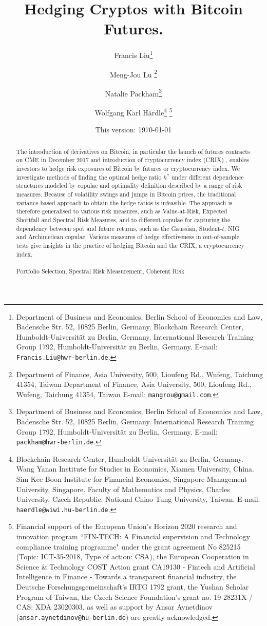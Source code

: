 \documentclass[11pt,a4paper,english]{article}
\title{\LARGE \bf Hedging Cryptos with Bitcoin Futures.}
\author{
        \and
        Francis Liu\thanks{
			Department of Business and Economics, Berlin School of Economics and Law, Badensche Str. 52, 10825 Berlin, Germany.
            Blockchain Research Center, Humboldt-Universität zu Berlin, Germany.
            International Research Training Group
1792, Humboldt-Universität zu Berlin, Germany.
     E-mail: \texttt{Francis.Liu@hwr-berlin.de}.}
        \and
		Meng-Jou Lu
        \thanks{
             Department of Finance, Asia University, 500, Lioufeng Rd., Wufeng, Taichung 41354, Taiwan
             Department of Finance, Asia University, 500, Lioufeng Rd., Wufeng, Taichung 41354, Taiwan
     E-mail: \texttt{mangrou@gmail.com}.}
		 \and
        Natalie Packham\thanks{
			Department of Business and Economics, Berlin School of Economics and Law, Badensche Str. 52, 10825 Berlin, Germany.
            International Research Training Group 1792, Humboldt-Universität zu Berlin, Germany.
     E-mail: \texttt{packham@hwr-berlin.de}.}
		 \and
         Wolfgang Karl H\"ardle\thanks{
			Blockchain Research Center, Humboldt-Universit\"at zu Berlin, Germany. Wang Yanan Institute for Studies in Economics, Xiamen University, China. Sim Kee Boon Institute for Financial Economics, Singapore Management University, Singapore. Faculty of Mathematics and Physics, Charles University, Czech Republic. National Chiao Tung University, Taiwan.
     E-mail: \texttt{haerdle@wiwi.hu-berlin.de}.}
        \thanks{ Financial support of the European Union's Horizon 2020 research and innovation program ``FIN-TECH: A Financial supervision and Technology compliance training programme" under the grant agreement No 825215 (Topic: ICT-35-2018, Type of action: CSA), the European Cooperation in Science \& Technology COST Action grant CA19130 - Fintech and Artificial Intelligence in Finance - Towards a transparent financial industry, the Deutsche Forschungsgemeinschaft's IRTG 1792 grant, the Yushan Scholar Program of Taiwan, the Czech Science Foundation's grant no. 19-28231X / CAS: XDA 23020303, as well as support by Ansar Aynetdinov (\texttt{ansar.aynetdinov@hu-berlin.de}) are greatly acknowledged.
     }
}
\date{This version: \today}
\begin{document}
\newtheorem{lemma}{Lemma}
\newtheorem {proposition}[lemma]{Proposition}
\newtheorem {corollary}{Corollary}
\newtheorem {theorem}{Theorem}
\newtheorem{claim}[lemma]{Claim}
\newtheorem{comment}[lemma]{Comment}
\newtheorem{example}[lemma]{Example}
\newtheorem{fact}[lemma]{Fact}
\newtheorem{defn}[lemma]{Definition}
\newtheorem{exercise}{Exercise}[section]

\newtheorem{programming}[exercise]{Programming assignment}
\newenvironment{proof}{{\flushleft\textbf{\textsl{Proof.\ \ }}}}{\hfill{\hfill\rule{2mm}{2mm}}}

\maketitle

\begin{abstract}
\footnotesize{
The introduction of derivatives on Bitcoin, in particular the launch of futures contracts on CME in December 2017 and introduction of cryptocurrency index (CRIX) \citep{trimborn2018crix},
enables investors to hedge risk exposures of Bitcoin by futures or cryptocurrency index.
We investigate methods of finding the optimal hedge ratio $h^*$ under different dependence structures modeled by copulae and optimality definition described by a range of risk measures.
Because of volatility swings and jumps in Bitcoin prices, the traditional variance-based approach to obtain the hedge ratios is infeasible.
The approach is therefore generalised  to various risk measures, such as Value-at-Risk, Expected Shortfall and Spectral Risk Measures,
and to different copulae for capturing the dependency between spot and future returns, such as the Gaussian, Student-$t$,
NIG and Archimedean copulae. Various measures of hedge effectiveness in out-of-sample tests give insights in the practice of hedging Bitcoin and the CRIX,
a cryptocurrency index.\\

  \\
 Portfolio Selection, Spectral Risk Measurement,  Coherent Risk}\pagestyle{empty}\\
\end{abstract}
\end{document}
